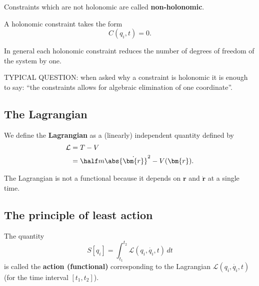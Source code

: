 \documentclass[12pt, a4paper]{article}
\begin{document}
\begin{mdremark}
    Constraints which are not holonomic are called \textbf{non-holonomic}.
\end{mdremark}

\begin{mdthm}
    A holonomic constraint takes the form
    \[C(q_i,t)=0.\]
\end{mdthm}

\begin{mdremark}
    In general each holonomic constraint reduces the number of degrees of freedom of the system by one.
\end{mdremark}

\begin{mdprop}
    TYPICAL QUESTION: when asked why a constraint is holonomic it is enough to say: ``the constraints allows for algebraic elimination of one coordinate''.
\end{mdprop}

\subsection{The Lagrangian}

\begin{definition}
    We define the \textbf{Lagrangian} as a (linearly) independent quantity defined by
    \[\begin{aligned}
        \mathcal{L}&=T-V \\
        &= \half m \abs{\dot{\bm{r}}}^2 - V(\bm{r}).
    \end{aligned}\]
\end{definition}

\begin{mdremark}
    The Lagrangian is not a functional because it depends on \(\bm{r}\) and \(\dot{\bm{r}}\) at a single time.
\end{mdremark}

\subsection{The principle of least action}

\begin{definition}
    The quantity
    \[S[q_i] = \int_{t_1}^{t_2} \mathcal{L}(q_i, \dot{q_i},t) \, dt\]
    is called the \textbf{action (functional)} corresponding to the Lagrangian \(\mathcal{L}(q_i, \dot{q_i},t)\) (for the time interval \([t_1,t_2]\)).
\end{definition}
\end{document}
